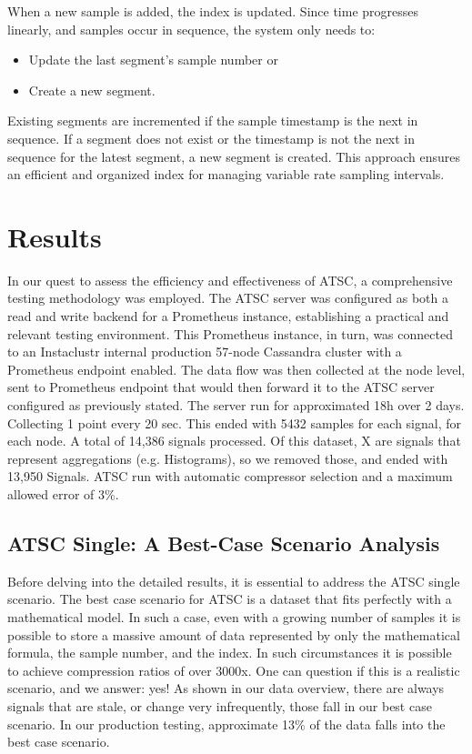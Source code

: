 \documentclass[conference]{IEEEtran}
\begin{document}
When a new sample is added, the index is updated. Since time progresses linearly, and samples occur in sequence, the system only needs to:
\begin{itemize}
    \item Update the last segment's sample number or
    \item Create a new segment.
\end{itemize}

Existing segments are incremented if the sample timestamp is the next in sequence. If a segment does not exist or the timestamp is not the next in sequence for the latest segment, a new segment is created. This approach ensures an efficient and organized index for managing variable rate sampling intervals.


\section{Results}

In our quest to assess the efficiency and effectiveness of ATSC, a comprehensive testing methodology was employed. 
The ATSC server was configured as both a read and write backend for a Prometheus instance, establishing a practical and relevant testing environment. 
This Prometheus instance, in turn, was connected to an Instaclustr internal production 57-node Cassandra cluster with a Prometheus endpoint enabled. 
The data flow was then collected at the node level, sent to Prometheus endpoint that would then forward it to the ATSC server configured as previously stated.
The server run for approximated 18h over 2 days. Collecting 1 point every 20 sec. This ended with 5432 samples for each signal, for each node.
A total of 14,386 signals processed.
Of this dataset, X are signals that represent aggregations (e.g. Histograms), so we removed those, and ended with 13,950 Signals.
ATSC run with automatic compressor selection and a maximum allowed error of 3\%.

\subsection{ATSC Single: A Best-Case Scenario Analysis}

Before delving into the detailed results, it is essential to address the ATSC single scenario.
The best case scenario for ATSC is a dataset that fits perfectly with a mathematical model.
In such a case, even with a growing number of samples it is possible to store a massive amount of data represented by only the mathematical formula, the sample number, and the index.
In such circumstances it is possible to achieve compression ratios of over 3000x.
One can question if this is a realistic scenario, and we answer: yes! As shown in our data overview, there are always signals that are stale, or change very infrequently, those fall in our best case scenario.
In our production testing, approximate 13\% of the data falls into the best case scenario.
\end{document}

